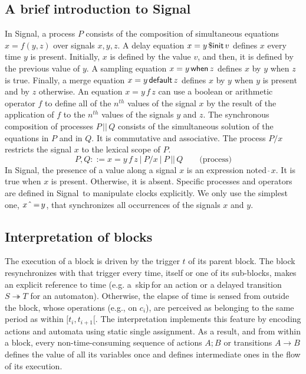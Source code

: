 \documentclass[copyright,creativecommons]{eptcs}
\newcommand{\signal}{{\sc Signal}}
\newcommand{\op}[1]{{\sf #1}}
\newcommand{\kw}[1]{{{\,\op{#1}\,}}}
\newcommand{\Pre}{\kw{\$ init}}
\newcommand{\Sync}{\kw{\mbox{$\hat{~}$}=}}
\newcommand{\Default}{\kw{default}}
\newcommand{\When}{\kw{when}}
\newcommand{\Par}{{\,|\!\!|\,}}
\newcommand{\ra}{\rightarrow}
\renewcommand{\:}{{:}}
\newcommand{\Skip}{{\kw{skip}}}
\newcommand{\rra}{\twoheadrightarrow}
\begin{document}
\subsection{A brief introduction to \signal}

In \signal, a process $P$ consists of the composition of simultaneous equations $x=f(y,z)$ over signals $x,y,z$. A delay equation $x= y\Pre v$ defines $x$ every time $y$ is present. Initially, $x$ is defined by the value $v$, and then, it is defined by the previous value of $y$. A sampling equation $x= y\When z$ defines $x$ by $y$ when $z$ is true. Finally, a merge equation $x=y\Default z$ defines $x$ by $y$ when $y$ is present and by $z$ otherwise. An equation $x=y\,f\,z$ can use a boolean or arithmetic operator $f$ to define all of the $n^{th}$ values of the signal $x$ by the result of the application of $f$ to the $n^{th}$ values of the signals $y$ and $z$. The synchronous composition of processes $P\Par Q$ consists of the simultaneous solution of the equations in $P$ and in $Q$. It is commutative and associative. The process $P/x$ restricts the signal $x$ to the lexical scope of $P$.
\[
P,Q ::= x=y\,f\,z\ |\ P/x\ |\ P\Par Q\qquad\mbox{(process)}
\]
In \signal, the presence of a value along a signal $x$ is an expression noted $\hat{~}x$. It is true when $x$ is present. Otherwise, it is absent. Specific processes and operators are defined in \signal\ to manipulate clocks explicitly. We only use the simplest one, $x\Sync y$, that synchronizes all occurrences of the signals $x$ and $y$.

\subsection{Interpretation of blocks}

The execution of a block is driven by the trigger $t$ of its parent block.  The block resynchronizes with that trigger every time, itself or one of its sub-blocks, makes an explicit reference to time (e.g. a \Skip for an action or a delayed transition $S\rra T$ for an automaton).  Otherwise, the elapse of time is sensed from outside the block, whose operations (e.g., on $c_i$), are perceived as belonging to the same period as within $[t_i, t_{i+1}[$. The interpretation implements this feature by encoding actions and automata using static single assignment. As a result, and from within a block, every non-time-consuming sequence of actions $A;B$ or transitions $A\ra B$ defines the value of all its variables once and defines intermediate ones in the flow of its execution.
\end{document}
